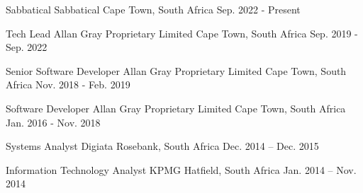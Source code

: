 

\begin{cventries}

  \cventry
    {Sabbatical} %
    {Sabbatical} %
    {Cape Town, South Africa} %
    {Sep. 2022 - Present} %
    {}

  \cventry
    {Tech Lead} %
    {Allan Gray Proprietary Limited} %
    {Cape Town, South Africa} %
    {Sep. 2019 - Sep. 2022} %
    {}

  \cventry
    {Senior Software Developer} %
    {Allan Gray Proprietary Limited} %
    {Cape Town, South Africa} %
    {Nov. 2018 - Feb. 2019} %
    {}

  \cventry
    {Software Developer} %
    {Allan Gray Proprietary Limited} %
    {Cape Town, South Africa} %
    {Jan. 2016 - Nov. 2018} %
    {}

  \cventry
    {Systems Analyst} %
    {Digiata} %
    {Rosebank, South Africa} %
    {Dec. 2014 – Dec. 2015}%
    {}
    
  \cventry
    {Information Technology Analyst} %
    {KPMG} %
    {Hatfield, South Africa} %
    {Jan. 2014 – Nov. 2014} %
    {}
\end{cventries}

